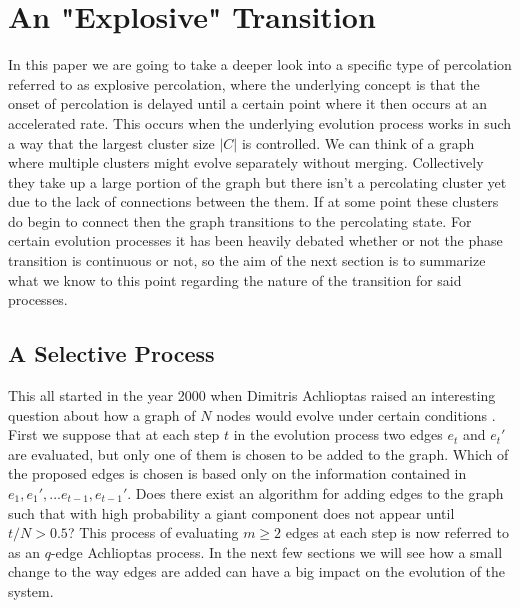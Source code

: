 \section{An "Explosive" Transition}
In this paper we are going to take a deeper look into a specific type of percolation referred to as explosive percolation, where the underlying concept is that the onset of percolation is delayed until a certain point where it then occurs at an accelerated rate.
This occurs when the underlying evolution process works in such a way that the largest cluster size $|C|$ is controlled.
We can think of a graph where multiple clusters might evolve separately without merging.
Collectively they take up a large portion of the graph but there isn't a percolating cluster yet due to the lack of connections between the them.
If at some point these clusters do begin to connect then the graph transitions to the percolating state.
For certain evolution processes it has been heavily debated whether or not the phase transition is continuous or not, so the aim of the next section is to summarize what we know to this point regarding the nature of the transition for said processes.



\subsection{A Selective Process}
This all started in the year 2000 when Dimitris Achlioptas raised an interesting question about how a graph of $N$ nodes would evolve under certain conditions \cite{BF}.
First we suppose that at each step $t$ in the evolution process two edges $e_t$ and $e_t'$ are evaluated, but only one of them is chosen to be added to the graph.
Which of the proposed edges is chosen is based only on the information contained in $e_1, e_1', ... e_{t-1}, e_{t-1}'$.
Does there exist an algorithm for adding edges to the graph such that with high probability a giant component does not appear until $t/N > 0.5$?
This process of evaluating $m \ge 2$ edges at each step is now referred to as an $q$-edge Achlioptas process.
In the next few sections we will see how a small change to the way edges are added can have a big impact on the evolution of the system.



